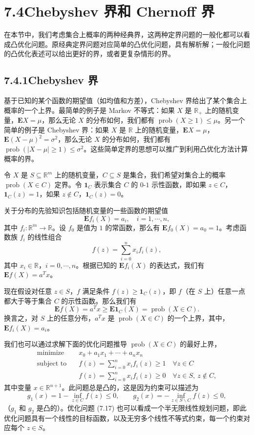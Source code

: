 \documentclass[UTF8, 12pt, fontset=fandol, oneside]{ctexart}
\begin{document}
\section*{7.4\quad Chebyshev 界和 Chernoff 界}

在本节中，我们考虑集合上概率的两种经典界，这两种定界问题的一般化都可以看成凸优化问题。原经典定界问题对应简单的凸优化问题，具有解析解；一般化问题的凸优化表述可以给出更好的界，或者更复杂情形的界。

\subsection*{7.4.1\quad Chebyshev 界}

基于已知的某个函数的期望值（如均值和方差），Chebyshev 界给出了某个集合上概率的一个上界。最简单的例子是 Markov 不等式：如果 $X$ 是 $\mathbb{R}_+$ 上的随机变量，$\mathbf{E}X=\mu$，那么无论 $X$ 的分布如何，我们都有 $\operatorname{prob}(X\geq 1)\leq \mu$。另一个简单的例子是 Chebyshev 界：如果 $X$ 是 $\mathbb{R}$ 上的随机变量，$\mathbf{E}X=\mu$，$\mathbf{E}(X-\mu)^2=\sigma^2$，那么无论 $X$ 的分布如何，我们都有 $\operatorname{prob}(|X-\mu|\geq 1)\leq\sigma^2$。这些简单定界的思想可以推广到利用凸优化方法计算概率的界。

令 $X$ 是 $S\subseteq\mathbb{R}^m$ 上的随机变量，$C\subseteq S$ 是集合，我们希望对集合上的概率 $\operatorname{prob}(X\in C)$ 定界。令 $\mathbf{1}_C$ 表示集合 $C$ 的 $0$-$1$ 示性函数，即如果 $z\in C$，$\mathbf{1}_C(z)=1$，如果 $z\notin C$，$\mathbf{1}_C(z)=0$。

关于分布的先验知识包括随机变量的一些函数的期望值
\[
\mathbf{E}f_i(X)=a_i,\quad i=1,\cdots,n,
\]
其中 $f_i:\mathbb{R}^m\to\mathbb{R}$。设 $f_0$ 是值为 $1$ 的常函数，那么有 $\mathbf{E}f_0(X)=a_0=1$。考虑函数族 $f_i$ 的线性组合
\[
f(z)=\sum_{i=0}^n x_if_i(z),
\]
其中 $x_i\in\mathbb{R}$，$i=0,\cdots,n$。根据已知的 $\mathbf{E}f_i(X)$ 的表达式，我们有 $\mathbf{E}f(X)=a^Tx$。

现在假设对任意 $z\in S$，$f$ 满足条件 $f(z)\geq \mathbf{1}_C(z)$，即 $f$（在 $S$ 上）任意一点都大于等于集合 $C$ 的示性函数。那么我们有
\[
\mathbf{E}f(X)=a^Tx\geq \mathbf{E}\mathbf{1}_C(X)=\operatorname{prob}(X\in C).
\]
换言之，对 $S$ 上的任意分布，$a^Tx$ 是 $\operatorname{prob}(X\in C)$ 的一个上界，其中，$\mathbf{E}f_i(X)=a_i$。

我们也可以通过求解下面的优化问题推导 $\operatorname{prob}(X\in C)$ 的最好上界，
\begin{equation}
\begin{aligned}
\text{minimize}\quad & x_0+a_1x_1+\cdots+a_nx_n\\
\text{subject to}\quad & f(z)=\sum_{i=0}^n x_if_i(z)\geq 1\quad \forall z\in C\\
& f(z)=\sum_{i=0}^n x_if_i(z)\geq 0\quad \forall z\in S,\ z\notin C,
\end{aligned}
\tag{7.17}
\end{equation}
其中变量 $x\in\mathbb{R}^{n+1}$。此问题总是凸的，这是因为约束可以描述为
\[
g_1(x)=1-\inf_{z\in C}f(z)\leq 0,\qquad
g_2(x)=-\inf_{z\in S\backslash C}f(z)\leq 0,
\]
（$g_1$ 和 $g_2$ 是凸的）。优化问题 (7.17) 也可以看成一个半无限线性规划问题，即此优化问题具有一个线性的目标函数，以及无穷多个线性不等式约束，每一个约束对应每个 $z\in S$。
\end{document}
